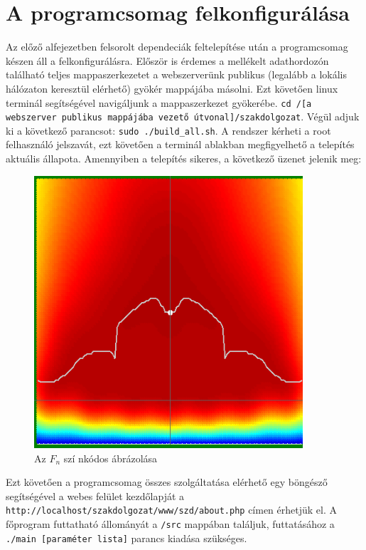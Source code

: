 \documentclass[oneside,titlepage,12pt,a4paper]{report}
\begin{document}
\section{A programcsomag felkonfigurálása}

Az előző alfejezetben felsorolt dependeciák feltelepítése után a programcsomag készen áll a felkonfigurálásra. Először is érdemes a mellékelt adathordozón található teljes mappaszerkezetet a webszerverünk publikus (legalább a lokális hálózaton keresztül elérhető) gyökér mappájába másolni. Ezt követően linux terminál segítségével navigáljunk a mappaszerkezet gyökerébe. \texttt{cd /[a webszerver publikus mappájába vezető útvonal]/szakdolgozat}. Végül adjuk ki a következő parancsot: \texttt{sudo ./build_all.sh}. A rendszer kérheti a root felhasználó jelszavát, ezt követően a terminál ablakban megfigyelhető a telepítés aktuális állapota. Amennyiben a telepítés sikeres, a következő üzenet jelenik meg:

\begin{figure}[H]
\begin{center}
   \includegraphics[width=100mm]{./Abrak/Ereszkedo1/F_2sz.png}
  \caption{Az $F_n$ szí nkódos ábrázolása}
\end{center}
\end{figure}

Ezt követően a programcsomag összes szolgáltatása elérhető egy böngésző segítségével a webes felület kezdőlapját a \texttt{http://localhost/szakdolgozat/www/szd/about.php} címen érhetjük el. A főprogram futtatható állományát a \texttt{/src} mappában találjuk, futtatásához a \texttt{./main [paraméter lista]} parancs kiadása szükséges. 
\end{document}
